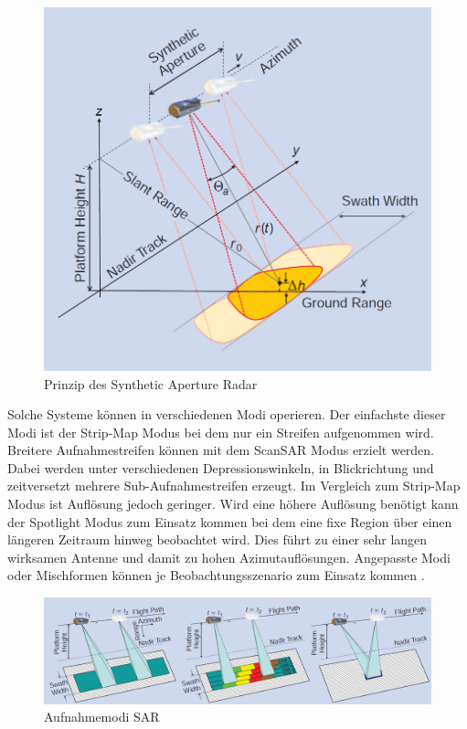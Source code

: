 \begin{figure}[H]
    \centering
    \includegraphics[width=12cm]{Bilder/SAR_Prinzip.png}
    \caption{Prinzip des Synthetic Aperture Radar \cite{tutorial_on_sar}}
    \label{fig:sar_prinzip}
\end{figure}

Solche Systeme können in verschiedenen Modi operieren. Der einfachste dieser Modi ist der Strip-Map Modus bei dem nur ein Streifen aufgenommen wird. Breitere Aufnahmestreifen
können mit dem ScanSAR Modus erzielt werden. Dabei werden unter verschiedenen Depressionswinkeln, in Blickrichtung und zeitversetzt mehrere Sub-Aufnahmestreifen erzeugt. 
Im Vergleich zum Strip-Map Modus ist Auflösung jedoch geringer. 
Wird eine höhere Auflösung benötigt kann der Spotlight Modus zum Einsatz kommen bei dem eine fixe Region über einen längeren Zeitraum hinweg beobachtet wird. Dies führt zu 
einer sehr langen wirksamen Antenne und damit zu hohen Azimutauflösungen. Angepasste Modi oder Mischformen können je Beobachtungsszenario zum Einsatz kommen \cite{tutorial_on_sar}. 

\begin{figure}[H]
    \centering
    \includegraphics[width=16cm]{Bilder/SAR_Modi.png}
    \caption{Aufnahmemodi SAR \cite{tutorial_on_sar}}
    \label{fig:sar_prinzip}
\end{figure}


